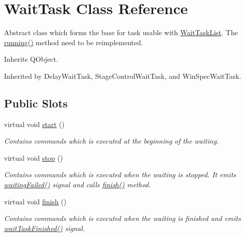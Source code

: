 \hypertarget{class_wait_task}{}\section{Wait\+Task Class Reference}
\label{class_wait_task}


Abstract class which forms the base for task usable with \hyperlink{class_wait_task_list}{Wait\+Task\+List}. The \hyperlink{class_wait_task_a39f09592449c61469d093f980a23cbfd}{running()} method need to be reimplemented.  




Inherits Q\+Object.



Inherited by Delay\+Wait\+Task, Stage\+Control\+Wait\+Task, and Win\+Spec\+Wait\+Task.

\subsection*{Public Slots}
\begin{DoxyCompactItemize}
\item 
\hypertarget{class_wait_task_ab20934c4c6723db758564eef74eec5c4}{}virtual void \hyperlink{class_wait_task_ab20934c4c6723db758564eef74eec5c4}{start} ()\label{class_wait_task_ab20934c4c6723db758564eef74eec5c4}

\begin{DoxyCompactList}\small\item\em Contains commands which is executed at the beginning of the waiting. \end{DoxyCompactList}\item 
\hypertarget{class_wait_task_a6bbc82bd62e9fc2cad789a24a6ab928a}{}virtual void \hyperlink{class_wait_task_a6bbc82bd62e9fc2cad789a24a6ab928a}{stop} ()\label{class_wait_task_a6bbc82bd62e9fc2cad789a24a6ab928a}

\begin{DoxyCompactList}\small\item\em Contains commands which is executed when the waiting is stopped. It emits \hyperlink{class_wait_task_a224392dd1ee8414b1bdb54619c45f001}{waiting\+Failed()} signal and calls \hyperlink{class_wait_task_a5f3a89b190e0ef7443cc3b9cc8857e9a}{finish()} method. \end{DoxyCompactList}\item 
\hypertarget{class_wait_task_a5f3a89b190e0ef7443cc3b9cc8857e9a}{}virtual void \hyperlink{class_wait_task_a5f3a89b190e0ef7443cc3b9cc8857e9a}{finish} ()\label{class_wait_task_a5f3a89b190e0ef7443cc3b9cc8857e9a}

\begin{DoxyCompactList}\small\item\em Contains commands which is executed when the waiting is finished and emits \hyperlink{class_wait_task_ae52cf854c36339a1cad9c643e6259978}{wait\+Task\+Finished()} signal. \end{DoxyCompactList}\end{DoxyCompactItemize}
